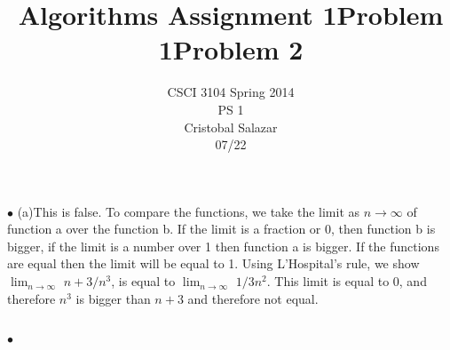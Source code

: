 \documentclass[11pt]{article}
\title{\textbf{Algorithms Assignment 1}}
\author{CSCI 3104 Spring 2014\\
		PS 1\\
		Cristobal Salazar\\
		07/22}
\date{}
\begin{document}
\maketitle
\title{\bf Problem 1}

$\bullet$ (a)This is false. To compare the functions, we take the limit as $n \to \infty$ of function a over the function b. If the limit is a fraction or 0, then function b is bigger, if the limit is a number over 1 then function a is bigger. If the functions are equal then the limit will be equal to 1. Using L'Hospital's rule, we show $\lim_{n \to \infty}$ $n+3/n^3$, is equal to $\lim_{n \to \infty}$ $1/3n^2$. This limit is equal to 0, and therefore $n^3$ is bigger than $n+3$ and therefore not equal.
\\
\\
\maketitle
\title{\bf Problem 2}

$\bullet$
\end{document}
